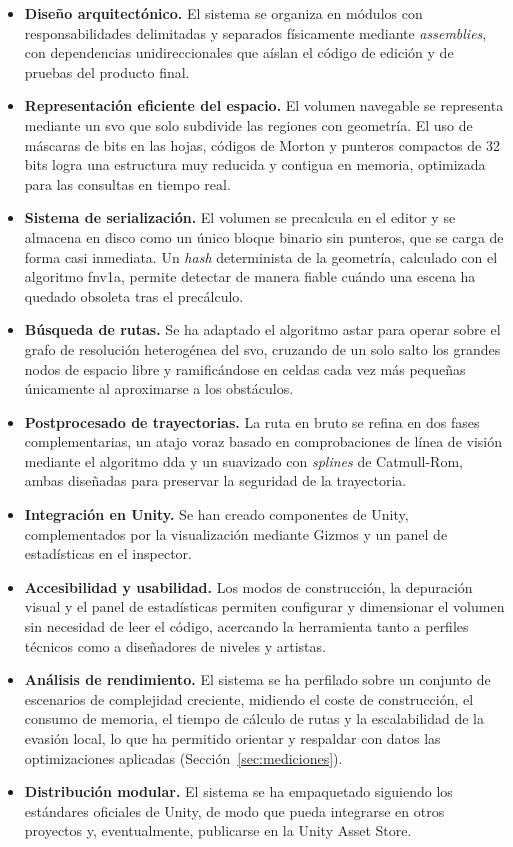 \begin{itemize}
    \item \textbf{Diseño arquitectónico.} El sistema se organiza en módulos con responsabilidades delimitadas y separados físicamente mediante \textit{assemblies}, con dependencias unidireccionales que aíslan el código de edición y de pruebas del producto final.
    \item \textbf{Representación eficiente del espacio.} El volumen navegable se representa mediante un \acrshort{svo} que solo subdivide las regiones con geometría.
    El uso de máscaras de bits en las hojas, códigos de Morton y punteros compactos de 32 bits logra una estructura muy reducida y contigua en memoria, optimizada para las consultas en tiempo real.
    \item \textbf{Sistema de serialización.} El volumen se precalcula en el editor y se almacena en disco como un único bloque binario sin punteros, que se carga de forma casi inmediata.
    Un \textit{hash} determinista de la geometría, calculado con el algoritmo \gls{fnv1a}, permite detectar de manera fiable cuándo una escena ha quedado obsoleta tras el precálculo.
    \item \textbf{Búsqueda de rutas.} Se ha adaptado el algoritmo \gls{astar} para operar sobre el grafo de resolución heterogénea del \acrshort{svo}, cruzando de un solo salto los grandes nodos de espacio libre y ramificándose en celdas cada vez más pequeñas únicamente al aproximarse a los obstáculos.
    \item \textbf{Postprocesado de trayectorias.} La ruta en bruto se refina en dos fases complementarias, un atajo voraz basado en comprobaciones de línea de visión mediante el algoritmo \acrshort{dda} y un suavizado con \textit{splines} de Catmull-Rom, ambas diseñadas para preservar la seguridad de la trayectoria.
    \item \textbf{Integración en Unity.} Se han creado componentes de Unity, complementados por la visualización mediante Gizmos y un panel de estadísticas en el inspector.
    \item \textbf{Accesibilidad y usabilidad.} Los modos de construcción, la depuración visual y el panel de estadísticas permiten configurar y dimensionar el volumen sin necesidad de leer el código, acercando la herramienta tanto a perfiles técnicos como a diseñadores de niveles y artistas.
    \item \textbf{Análisis de rendimiento.} El sistema se ha perfilado sobre un conjunto de escenarios de complejidad creciente, midiendo el coste de construcción, el consumo de memoria, el tiempo de cálculo de rutas y la escalabilidad de la evasión local, lo que ha permitido orientar y respaldar con datos las optimizaciones aplicadas (Sección~\ref{sec:mediciones}).
    \item \textbf{Distribución modular.} El sistema se ha empaquetado siguiendo los estándares oficiales de Unity, de modo que pueda integrarse en otros proyectos y, eventualmente, publicarse en la Unity Asset Store.
\end{itemize}

